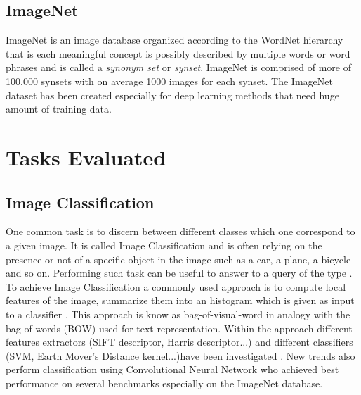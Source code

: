   \subsection{ImageNet}

  ImageNet is an image database organized according to the WordNet hierarchy that is each meaningful concept is possibly described by multiple words or word phrases and is called a \textit{synonym set} or \textit{synset}. ImageNet is comprised of more of 100,000 synsets with on average 1000 images for each synset. The ImageNet dataset has been created especially for deep learning methods that need huge amount of training data.

\section{Tasks Evaluated}



  \subsection{Image Classification}

    One common task is to discern between different classes which one correspond to a given image. It is called Image Classification and is often relying on the presence or not of a specific object in the image such as a car, a plane, a bicycle and so on. Performing such task can be useful to answer to a query of the type . To achieve Image Classification a commonly used approach is to compute local features of the image, summarize them into an histogram which is given as input to a classifier \cite{everingham2010pascal}. This approach is know as bag-of-visual-word in analogy with the bag-of-words (BOW) used for text representation. Within the approach different features extractors (SIFT descriptor, Harris descriptor...) and different classifiers (SVM, Earth Mover’s Distance kernel...)have been investigated \cite{csurka2004visual}
    \cite{zhang2007local} \cite{lowe2004distinctive}. New trends also perform classification using Convolutional Neural Network who achieved best performance on several benchmarks especially on the ImageNet database.

